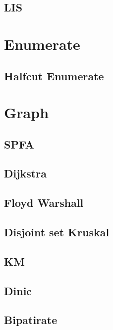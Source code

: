         \subsection{LIS}
                  

\section{Enumerate} 
        \subsection{Halfcut Enumerate}
                

\section{Graph}
        \subsection{SPFA}
                
        \subsection{Dijkstra}
                
        \subsection{Floyd Warshall}
                
        \subsection{Disjoint set Kruskal}
                
        \subsection{KM}
                
        \subsection{Dinic}
                
        \subsection{Bipatirate}
                
